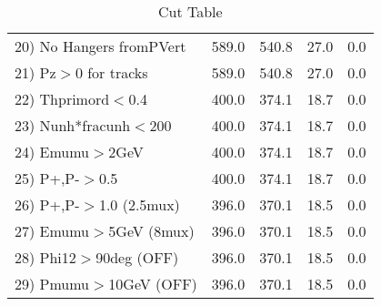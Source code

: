 \begin{table}[h!]
\begin{tabular}{||l||r|r|r|r||}
 20) No Hangers fromPVert &       589.0 &       540.8 &        27.0 &         0.0 \\
 21) Pz$>$0 for tracks    &       589.0 &       540.8 &        27.0 &         0.0 \\
 22) Thprimord$<$0.4      &       400.0 &       374.1 &        18.7 &         0.0 \\
 23) Nunh*fracunh$<$200   &       400.0 &       374.1 &        18.7 &         0.0 \\
 24) Emumu$>$2GeV         &       400.0 &       374.1 &        18.7 &         0.0 \\
 25) P+,P-$>$0.5          &       400.0 &       374.1 &        18.7 &         0.0 \\
 26) P+,P-$>$1.0 (2.5mux) &       396.0 &       370.1 &        18.5 &         0.0 \\
 27) Emumu$>$5GeV  (8mux) &       396.0 &       370.1 &        18.5 &         0.0 \\
 28) Phi12$>$90deg  (OFF) &       396.0 &       370.1 &        18.5 &         0.0 \\
 29) Pmumu$>$10GeV  (OFF) &       396.0 &       370.1 &        18.5 &         0.0 \\
 \hline
 \hline
 \end{tabular}
 \caption{Cut Table \cohrp  }
 \label{tab-cut_crhop}
 \end{table}

